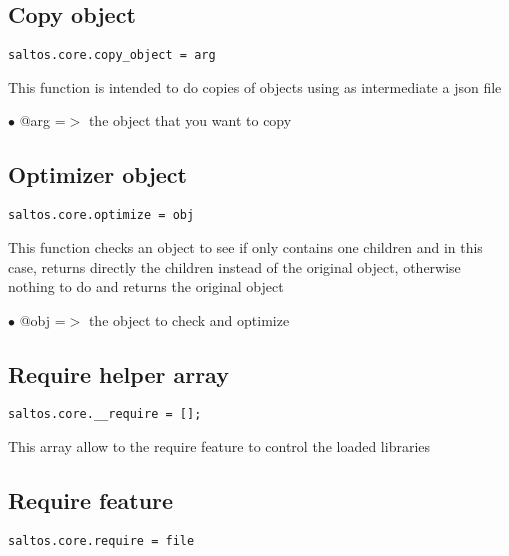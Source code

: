 \documentclass[a4paper]{book}
\begin{document}
\hypertarget{toc492}{}
\subsection{Copy object}

\begin{lstlisting}
saltos.core.copy_object = arg
\end{lstlisting}

This function is intended to do copies of objects using as intermediate a json file

\begin{compactitem}
\item[\color{myblue}$\bullet$] @arg =$>$ the object that you want to copy
\end{compactitem}

\hypertarget{toc493}{}
\subsection{Optimizer object}

\begin{lstlisting}
saltos.core.optimize = obj
\end{lstlisting}

This function checks an object to see if only contains one children and in this case, returns
directly the children instead of the original object, otherwise nothing to do and returns the
original object

\begin{compactitem}
\item[\color{myblue}$\bullet$] @obj =$>$ the object to check and optimize
\end{compactitem}

\hypertarget{toc494}{}
\subsection{Require helper array}

\begin{lstlisting}
saltos.core.__require = [];
\end{lstlisting}

This array allow to the require feature to control the loaded libraries

\hypertarget{toc495}{}
\subsection{Require feature}

\begin{lstlisting}
saltos.core.require = file
\end{lstlisting}
\end{document}
